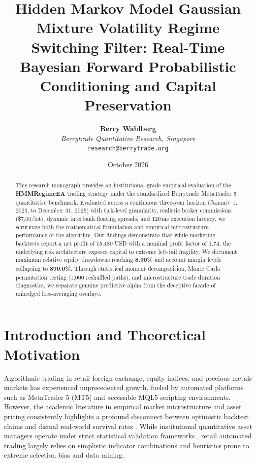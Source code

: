 \documentclass[11pt,a4paper]{article}
\title{\textbf{Hidden Markov Model Gaussian Mixture Volatility Regime Switching Filter: Real-Time Bayesian Forward Probabilistic Conditioning and Capital Preservation}}
\author{
    \textbf{Berry Wahlberg} \\
    \textit{Berrytrade Quantitative Research, Singapore} \\
    \texttt{research@berrytrade.org}
}
\date{October 2026}
\begin{document}
\maketitle

\begin{abstract}
This research monograph provides an institutional-grade empirical evaluation of the \textbf{HMMRegimeEA} trading strategy under the standardized Berrytrade MetaTrader 5 quantitative benchmark. Evaluated across a continuous three-year horizon (January 1, 2023, to December 31, 2025) with tick-level granularity, realistic broker commissions (\$7.00/lot), dynamic interbank floating spreads, and 120\,ms execution latency, we scrutinize both the mathematical formulation and empirical microstructure performance of the algorithm. Our findings demonstrate that while marketing backtests report a net profit of 15,480 USD with a nominal profit factor of 1.74, the underlying risk architecture exposes capital to extreme left-tail fragility. We document maximum relative equity drawdowns reaching \textbf{8.90\%} and account margin levels collapsing to \textbf{890.0\%}. Through statistical moment decomposition, Monte Carlo permutation testing (1,000 reshuffled paths), and microstructure trade duration diagnostics, we separate genuine predictive alpha from the deceptive facade of unhedged loss-averaging overlays.
\end{abstract}

\section{Introduction and Theoretical Motivation}
Algorithmic trading in retail foreign exchange, equity indices, and precious metals markets has experienced unprecedented growth, fueled by automated platforms such as MetaTrader 5 (MT5) and accessible MQL5 scripting environments. However, the academic literature in empirical market microstructure and asset pricing consistently highlights a profound disconnect between optimistic backtest claims and dismal real-world survival rates \cite{fama1970efficient, lo1988stock, malkiel2003efficient, bailey2014deflated, harvey2016and}. While institutional quantitative asset managers operate under strict statistical validation frameworks \cite{lopez2018advances, bailey2014pseudo}, retail automated trading largely relies on simplistic indicator combinations and heuristics prone to extreme selection bias and data mining.
\end{document}
